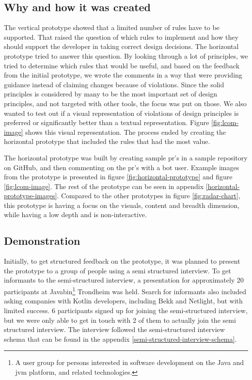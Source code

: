 \documentclass[pdftex,10pt,b5paper,twoside]{report}
\begin{document}
\subsection*{Why and how it was created}
The vertical prototype showed that a limited number of rules have to be supported. That raised the question of which rules to implement and how they should support the developer in taking correct design decisions. The horizontal prototype tried to answer this question. By looking through a lot of principles, we tried to determine which rules that would be useful, and based on the feedback from the initial prototype, we wrote the comments in a way that were providing guidance instead of claiming changes because of violations. Since the \gls{solid} principles is considered by many to be the most important set of design principles, and not targeted with other tools, the focus was put on those. We also wanted to test out if a visual representation of violations of design principles is preferred or significantly better than a textual representation. Figure \ref{fig:lcom-image} shows this visual representation. The process ended by creating the horizontal prototype that included the rules that had the most value. 

The horizontal prototype was built by creating sample \gls{pr}'s in a sample repository on GitHub, and then commenting on the \gls{pr}'s with a bot user. Example images from the prototype is presented in figure \ref{fig:horizontal-prototype} and figure \ref{fig:lcom-image}. The rest of the prototype can be seen in appendix \ref{horizontal-prototype-images}. Compared to the other prototypes in figure \ref{fig:radar-chart}, this prototype is having a focus on the visuals, content and breadth dimension, while having a low depth and is non-interactive.


\subsection*{Demonstration}
Initially, to get structured feedback on the prototype, it was planned to present the prototype to a group of people using a semi structured interview. To get informants to the semi-structured interview, a presentation for approximately 20 participants at Javabin\footnote{A user group for persons interested in software development on the Java and \gls{jvm} platform, and related technologies.} Trondheim was held. Search for informants also included asking companies with Kotlin developers, including Bekk and Netlight, but with limited success. 6 participants signed up for joining the semi-structured interview, but we were only able to get in touch with 2 of them to actually join the semi structured interview. The interview followed the semi-structured interview schema that can be found in the appendix \ref{semi-structured-interview-schema}.
\end{document}

